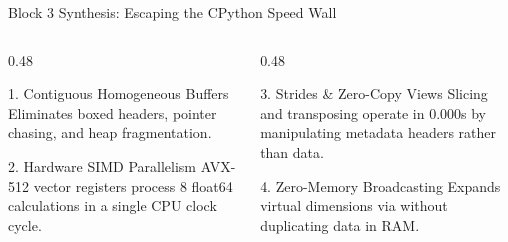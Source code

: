 \begin{frame}{Block 3 Synthesis: Escaping the CPython Speed Wall}
  \begin{columns}[T,onlytextwidth]
    \begin{column}{0.48\textwidth}
      \begin{ConceptBox}{1. Contiguous Homogeneous Buffers}
        \scriptsize Eliminates boxed  headers, pointer chasing, and heap fragmentation.
      \end{ConceptBox}
      \vspace{0.08cm}
      \begin{ConceptBox}{2. Hardware SIMD Parallelism}
        \scriptsize AVX-512 vector registers process 8 float64 calculations in a single CPU clock cycle.
      \end{ConceptBox}
    \end{column}
    \begin{column}{0.48\textwidth}
      \begin{ConceptBox}{3. Strides \& Zero-Copy Views}
        \scriptsize Slicing and transposing operate in 0.000s by manipulating metadata headers rather than data.
      \end{ConceptBox}
      \vspace{0.08cm}
      \begin{ConceptBox}{4. Zero-Memory Broadcasting}
        \scriptsize Expands virtual dimensions via  without duplicating data in RAM.
      \end{ConceptBox}
    \end{column}
  \end{columns}
  \vspace{0.18cm}
\end{frame}
